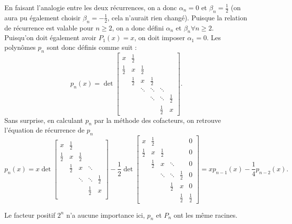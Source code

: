 En faisant l'analogie entre les deux récurrences,
on a donc $\alpha_n = 0$ et $\beta_n = \frac{1}{2}$
(on aura pu également choisir $\beta_n = -\frac{1}{2}$,
cela n'aurait rien changé).
Puisque la relation de récurrence est valable pour $n \geq 2$, on a donc défini $\alpha_n$ et $\beta_n \forall n \geq 2$.\\ Puisqu'on doit également avoir $P_1(x) = x$, on doit imposer $\alpha_1 = 0$. Les polynômes $p_n$ sont donc définis comme suit :
$$
p_n(x) = \det
\left[
  \begin{array}{cccccc}
    x & \frac{1}{2} & & & &  \\
    \frac{1}{2} & x & \frac{1}{2} & & & \\
      & \frac{1}{2} & x & \frac{1}{2} & & \\
      & & \ddots & \ddots & \ddots & \\
      & & & \ddots & \ddots &  \frac{1}{2}\\
      & & & &  \frac{1}{2} & x
  \end{array}
\right].
$$
Sans surprise, en calculant $p_n$ par la méthode des cofacteurs, on retrouve l'équation de récurrence de $p_n$
$$
p_n(x) = x \det
\left[
\begin{array}{ccccc}
x & \frac 12 & & &  \\
  \frac 12 & x & \frac 12 & & \\
 & \frac 12 & x & \ddots & \\
 & & \ddots & \ddots & \frac 12  \\
 & & & \frac 12 & x   \\
\end{array}
\right] - \frac 12\det
\left[
\begin{array}{cccccc}
x & \frac 12 & & & & 0 \\
\frac 12 & x & \frac 12 & & & 0\\
 & \frac 12 & x & \ddots & & 0\\
 & & \ddots & \ddots & \frac 12 & 0\\
 & & & \frac 12 & x &  0\\
 & & & &  \frac 12 &  \frac 12
\end{array}
\right] = xp_{n-1}(x)-\frac{1}{4}p_{n-2}(x).
$$

Le facteur positif $2^n$ n'a aucune importance ici,
$p_n$ et $P_n$ ont les même racines.

